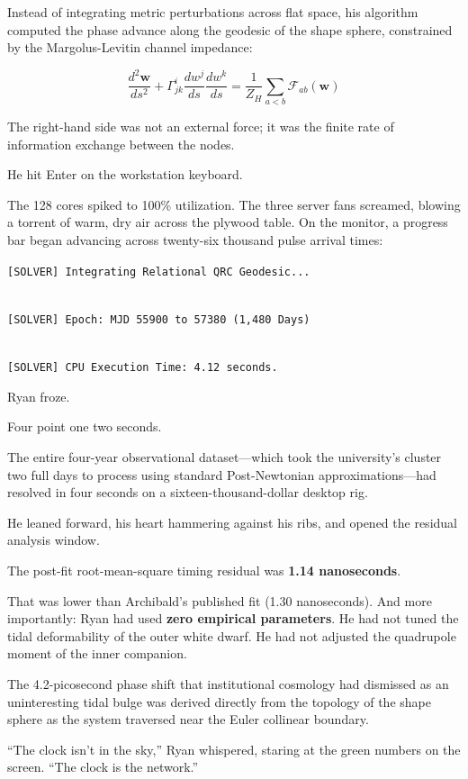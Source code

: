 \documentclass[12pt,twoside,openright]{book}
\begin{document}
Instead of integrating metric perturbations across flat space, his
algorithm computed the phase advance along the geodesic of the shape
sphere, constrained by the Margolus-Levitin channel impedance:

\[\frac{d^2 \mathbf{w}}{ds^2} + \Gamma^i_{jk} \frac{dw^j}{ds} \frac{dw^k}{ds} = \frac{1}{Z_H} \sum_{a < b} \mathcal{F}_{ab}(\mathbf{w})\]

The right-hand side was not an external force; it was the finite rate of
information exchange between the nodes.

He hit Enter on the workstation keyboard.

The 128 cores spiked to 100\% utilization. The three server fans
screamed, blowing a torrent of warm, dry air across the plywood table.
On the monitor, a progress bar began advancing across twenty-six
thousand pulse arrival times:

\passthrough{\lstinline![SOLVER] Integrating Relational QRC Geodesic...!}\strut \\
\passthrough{\lstinline![SOLVER] Epoch: MJD 55900 to 57380 (1,480 Days)!}\strut \\
\passthrough{\lstinline![SOLVER] CPU Execution Time: 4.12 seconds.!}

Ryan froze.

Four point one two seconds.

The entire four-year observational dataset---which took the university's
cluster two full days to process using standard Post-Newtonian
approximations---had resolved in four seconds on a
sixteen-thousand-dollar desktop rig.

He leaned forward, his heart hammering against his ribs, and opened the
residual analysis window.

The post-fit root-mean-square timing residual was \textbf{1.14
nanoseconds}.

That was lower than Archibald's published fit (1.30 nanoseconds). And
more importantly: Ryan had used \textbf{zero empirical parameters}. He
had not tuned the tidal deformability of the outer white dwarf. He had
not adjusted the quadrupole moment of the inner companion.

The 4.2-picosecond phase shift that institutional cosmology had
dismissed as an uninteresting tidal bulge was derived directly from the
topology of the shape sphere as the system traversed near the Euler
collinear boundary.

``The clock isn't in the sky,'' Ryan whispered, staring at the green
numbers on the screen. ``The clock is the network.''
\end{document}
